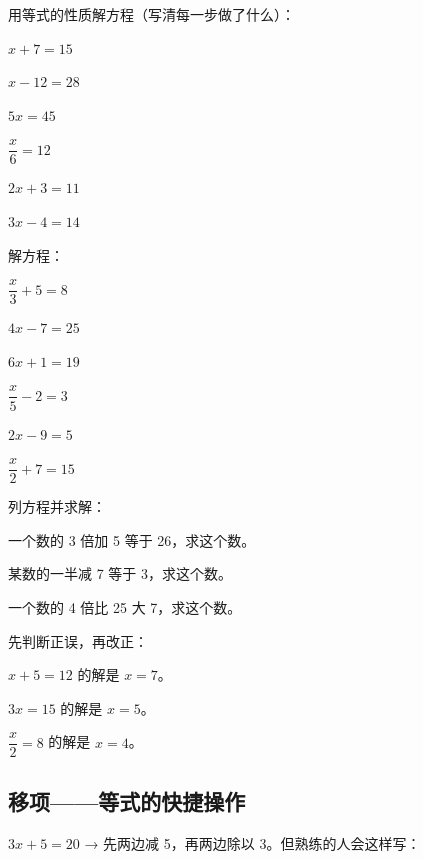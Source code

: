 \begin{exercise}
\item 用等式的性质解方程（写清每一步做了什么）：
  \begin{subexercise}
    \item $x+7=15$
    \item $x-12=28$
    \item $5x=45$
    \item $\dfrac{x}{6}=12$
    \item $2x+3=11$
    \item $3x-4=14$
  \end{subexercise}

\item 解方程：
  \begin{subexercise}
    \item $\dfrac{x}{3}+5=8$
    \item $4x-7=25$
    \item $6x+1=19$
    \item $\dfrac{x}{5}-2=3$
    \item $2x-9=5$
    \item $\dfrac{x}{2}+7=15$
  \end{subexercise}

\item 列方程并求解：
  \begin{subexercise}
    \item 一个数的 3 倍加 5 等于 26，求这个数。
    \item 某数的一半减 7 等于 3，求这个数。
    \item 一个数的 4 倍比 25 大 7，求这个数。
  \end{subexercise}

\item 先判断正误，再改正：
  \begin{subexercise}
    \item $x+5=12$ 的解是 $x=7$。
    \item $3x=15$ 的解是 $x=5$。
    \item $\dfrac{x}{2}=8$ 的解是 $x=4$。
  \end{subexercise}
\end{exercise}


\subsection*{移项——等式的快捷操作}

$3x+5=20$ → 先两边减 5，再两边除以 3。但熟练的人会这样写：

